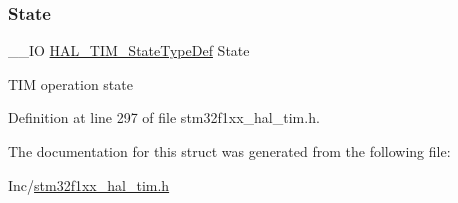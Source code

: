 \subsubsection{\texorpdfstring{State}{State}}
{\footnotesize\ttfamily \+\_\+\+\_\+\+IO \hyperlink{group___t_i_m___exported___types_gae0994cf5970e56ca4903e9151f40010c}{H\+A\+L\+\_\+\+T\+I\+M\+\_\+\+State\+Type\+Def} State}

T\+IM operation state 

Definition at line 297 of file stm32f1xx\+\_\+hal\+\_\+tim.\+h.



The documentation for this struct was generated from the following file\+:\begin{DoxyCompactItemize}
\item 
Inc/\hyperlink{stm32f1xx__hal__tim_8h}{stm32f1xx\+\_\+hal\+\_\+tim.\+h}\end{DoxyCompactItemize}
